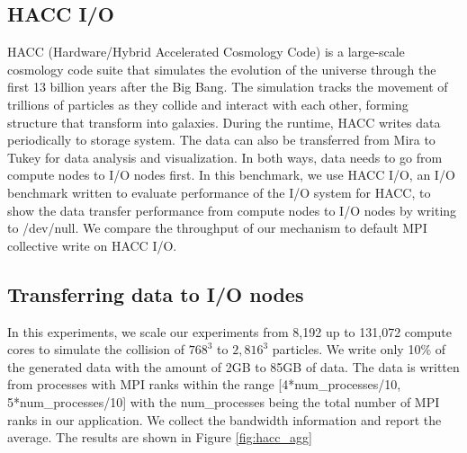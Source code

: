 \documentclass[final,5p,times]{elsarticle}
\begin{document}
\subsection {HACC I/O}
HACC (Hardware/Hybrid Accelerated Cosmology Code) \cite{Habib:HACC} is a large-scale cosmology code suite that simulates the evolution of the universe through the first 13 billion years after the Big Bang. The simulation tracks the movement of trillions of particles as they collide and interact with each other, forming structure that transform into galaxies. During the runtime, HACC writes data periodically to storage system. The data can also be transferred from Mira to Tukey for data analysis and visualization. In both ways, data needs to go from compute nodes to I/O nodes first. In this benchmark, we use HACC I/O, an I/O benchmark written to evaluate performance of the I/O system for HACC, to show the data transfer performance from compute nodes to I/O nodes by writing to /dev/null. We compare the throughput of our mechanism to default MPI collective write on HACC I/O.

\subsection{Transferring data to I/O nodes}
In this experiments, we scale our experiments from 8,192 up to 131,072 compute cores to simulate the collision of $768^3$ to $2,816^3$ particles. We write only 10\% of the generated data with the amount of 2GB to 85GB of data. The data is written from processes with MPI ranks within the range [4*num\_processes/10, 5*num\_processes/10] with the num\_processes being the total number of MPI ranks in our application. We collect the bandwidth information and report the average. The results are shown in Figure \ref{fig:hacc_agg}
\end{document}
